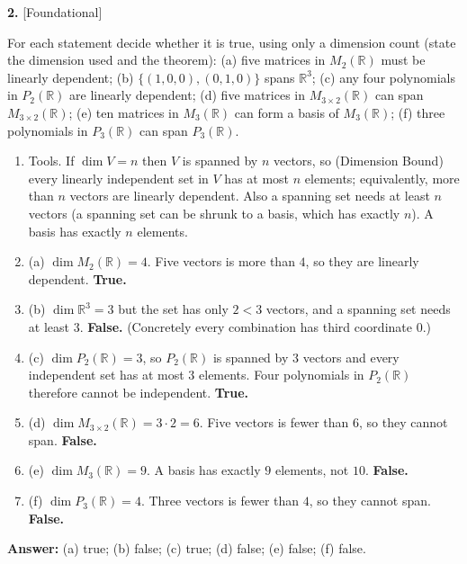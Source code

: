 \documentclass[11pt]{article}
\begin{document}
\par\vspace{2pt}
\begin{minipage}{\linewidth}\textbf{2.} \hfill{\scriptsize\color{ink}[Foundational]}\par\nopagebreak For each statement decide whether it is true, using only a dimension count (state the dimension used and the theorem): (a) five matrices in $M_2(\mathbb{R})$ must be linearly dependent; (b) $\{(1,0,0),(0,1,0)\}$ spans $\mathbb{R}^{3}$; (c) any four polynomials in $P_2(\mathbb{R})$ are linearly dependent; (d) five matrices in $M_{3\times2}(\mathbb{R})$ can span $M_{3\times2}(\mathbb{R})$; (e) ten matrices in $M_3(\mathbb{R})$ can form a basis of $M_3(\mathbb{R})$; (f) three polynomials in $P_3(\mathbb{R})$ can span $P_3(\mathbb{R})$.
\end{minipage}\par\nopagebreak
\begin{tcolorbox}[breakable,colback=ans,colframe=ansb,boxrule=0.5pt,left=4pt,right=4pt,top=2pt,bottom=2pt]\begin{enumerate}[leftmargin=3.1em,itemsep=1pt,topsep=1pt,label=\textbf{Step \arabic*.}]\item Tools. If $\dim V=n$ then $V$ is spanned by $n$ vectors, so (Dimension Bound) every linearly independent set in $V$ has at most $n$ elements; equivalently, more than $n$ vectors are linearly dependent. Also a spanning set needs at least $n$ vectors (a spanning set can be shrunk to a basis, which has exactly $n$). A basis has exactly $n$ elements.
\item (a) $\dim M_2(\mathbb{R})=4$. Five vectors is more than $4$, so they are linearly dependent. \textbf{True.}
\item (b) $\dim\mathbb{R}^{3}=3$ but the set has only $2<3$ vectors, and a spanning set needs at least $3$. \textbf{False.} (Concretely every combination has third coordinate $0$.)
\item (c) $\dim P_2(\mathbb{R})=3$, so $P_2(\mathbb{R})$ is spanned by $3$ vectors and every independent set has at most $3$ elements. Four polynomials in $P_2(\mathbb{R})$ therefore cannot be independent. \textbf{True.}
\item (d) $\dim M_{3\times2}(\mathbb{R})=3\cdot2=6$. Five vectors is fewer than $6$, so they cannot span. \textbf{False.}
\item (e) $\dim M_3(\mathbb{R})=9$. A basis has exactly $9$ elements, not $10$. \textbf{False.}
\item (f) $\dim P_3(\mathbb{R})=4$. Three vectors is fewer than $4$, so they cannot span. \textbf{False.}
\end{enumerate}\textbf{Answer:} (a) true; (b) false; (c) true; (d) false; (e) false; (f) false.\end{tcolorbox}
\end{document}
